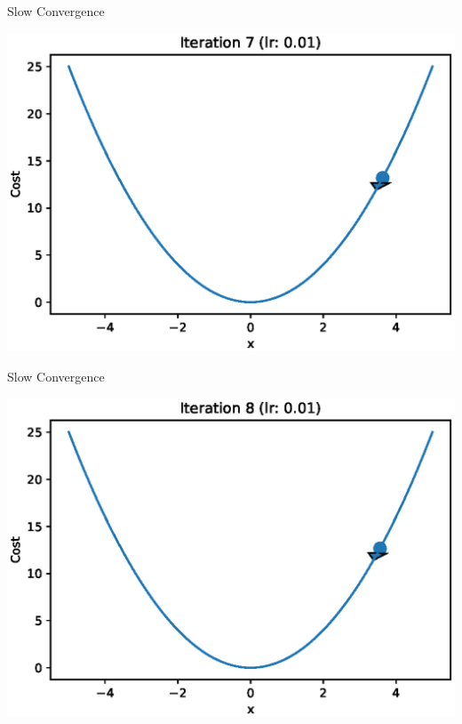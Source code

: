 \documentclass{beamer}
\begin{document}
	\begin{frame}{Slow Convergence}
		\begin{center}
			\includegraphics[totalheight=6cm]{gradient-descent/undershooting-7.eps}
		\end{center}
	\end{frame}
	
	\begin{frame}{Slow Convergence}
		\begin{center}
			\includegraphics[totalheight=6cm]{gradient-descent/undershooting-8.eps}
		\end{center}
	\end{frame}
	
\end{document}
